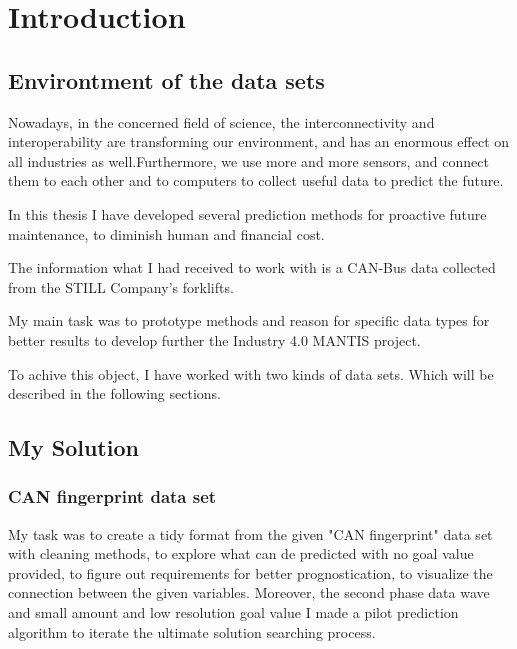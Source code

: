 \chapter*{Introduction}
\section{Environtment of the data sets}
Nowadays, in the concerned field of science, the interconnectivity and interoperability are transforming our environment, and has an enormous effect on all industries as well.Furthermore, we use more and more sensors, and connect them to each other and to computers to collect useful data to predict the future.

In this thesis I have developed several prediction methods for proactive future maintenance, to diminish human and financial cost.

The information what I had received to work with is a CAN-Bus data collected from the STILL Company's forklifts.

My main task was to prototype methods and reason for specific data types for better results to develop further the Industry 4.0 MANTIS project.

To achive this object, I have worked with two kinds of data sets. Which will be described in the following sections.
\section{My Solution}
    \subsection{CAN fingerprint data set}
My task was to create a tidy format from the given "CAN fingerprint" data set with cleaning methods, to explore what can de predicted with no goal value provided, to figure out requirements for better prognostication, to visualize the connection between the given variables. Moreover, the second phase data wave and small amount and low resolution goal value I made a pilot prediction algorithm to iterate the ultimate solution searching process. 
